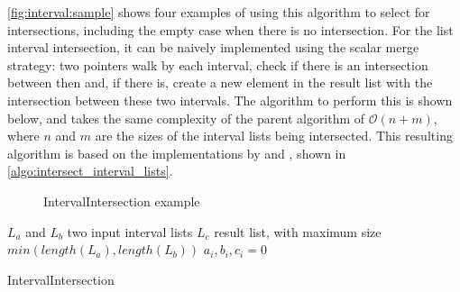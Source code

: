 \autoref{fig:interval:sample} shows four examples of using this algorithm to select for intersections, including the empty case when there is no intersection.
For the list interval intersection, it can be naively implemented using the scalar merge strategy: two pointers walk by each interval, check if there is an intersection between then and, if there is, create a new element in the result list with the intersection between these two intervals.
The algorithm to perform this is shown below, and takes the same complexity of the parent algorithm of $\mathcal{O}(n + m)$, where $n$ and $m$ are the sizes of the interval lists being intersected.
This resulting algorithm is based on the implementations by \cite{liHighdimensionalOLAPMinimal2004} and \cite{silva:2015:abordagensParaCubo}, shown in \autoref{algo:intersect_interval_lists}.

\begin{figure}[H]
  \caption{IntervalIntersection example}\label{fig:interval:sample}
  \vspace{6mm}
  \begin{center}
  \end{center}
  \vspace{2mm}
\end{figure}

\begin{algorithm}[H]
\SetAlgoLined
{}
 $L_a$ and $L_b$ two input interval lists\;
 $L_c$ result list, with maximum size $min(length(L_a), length(L_b))$\;
 $a_i, b_i, c_i = 0$\;
 \;
 \caption{IntervalIntersection}\label{algo:intersect_interval_lists}
\end{algorithm}

